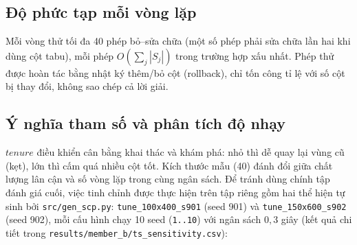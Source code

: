 \subsection{Độ phức tạp mỗi vòng lặp}
Mỗi vòng thử tối đa 40 phép bỏ--sửa chữa (một số phép phải sửa chữa lần hai khi dùng cột tabu), mỗi phép $O(\sum_j|S_j|)$ trong trường hợp xấu nhất.
Phép thử được hoàn tác bằng nhật ký thêm/bỏ cột (rollback), chỉ tốn công tỉ lệ với số cột bị thay đổi, không sao chép cả lời giải.

\subsection{Ý nghĩa tham số và phân tích độ nhạy}
$tenure$ điều khiển cân bằng khai thác và khám phá: nhỏ thì dễ quay lại vùng cũ (kẹt), lớn thì cấm quá nhiều cột tốt.
Kích thước mẫu (40) đánh đổi giữa chất lượng lân cận và số vòng lặp trong cùng ngân sách.
Để tránh dùng chính tập đánh giá cuối, việc tinh chỉnh được thực hiện trên tập riêng gồm hai thể hiện tự sinh bởi \texttt{src/gen\_scp.py}: \texttt{tune\_100x400\_s901} (seed 901) và \texttt{tune\_150x600\_s902} (seed 902), mỗi cấu hình chạy 10 seed (\texttt{1..10}) với ngân sách $0{,}3$ giây (kết quả chi tiết trong \texttt{results/member\_b/ts\_sensitivity.csv}):

